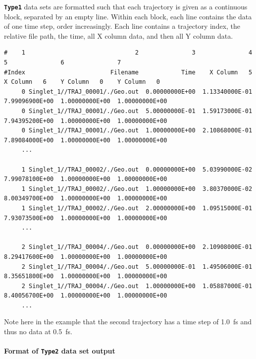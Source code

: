 \documentclass[a4paper,10pt,DIV=15,openany,twoside=false]{scrbook}
\newcommand{\ttt}[1]{\textbf{\texttt{#1}}}
\newenvironment{example}{
  \setlength{\OuterFrameSep}{3pt}
  \vspace{0mm}
  \definecolor{shadecolor}{HTML}{E4F4FF}
  \begin{shaded}
}{
  \end{shaded}
}
\begin{document}
\ttt{Type1} data sets are formatted such that each trajectory is given as a continuous block, separated by an empty line.
Within each block, each line contains the data of one time step, order increasingly.
Each line contains a trajectory index, the relative file path, the time, all X column data, and then all Y column data.
\begin{example}
\footnotesize\begin{verbatim}
#    1                               2               3               4               5               6               7
#Index                        Filename            Time    X Column   5    X Column   6    Y Column   0    Y Column   0
     0 Singlet_1//TRAJ_00001/./Geo.out  0.00000000E+00  1.13340000E-01  7.99096900E+00  1.00000000E+00  1.00000000E+00
     0 Singlet_1//TRAJ_00001/./Geo.out  5.00000000E-01  1.59173000E-01  7.94395200E+00  1.00000000E+00  1.00000000E+00
     0 Singlet_1//TRAJ_00001/./Geo.out  1.00000000E+00  2.10868000E-01  7.89084000E+00  1.00000000E+00  1.00000000E+00
     ...

     1 Singlet_1//TRAJ_00002/./Geo.out  0.00000000E+00  5.03990000E-02  7.99078100E+00  1.00000000E+00  1.00000000E+00
     1 Singlet_1//TRAJ_00002/./Geo.out  1.00000000E+00  3.80370000E-02  8.00349700E+00  1.00000000E+00  1.00000000E+00  
     1 Singlet_1//TRAJ_00002/./Geo.out  2.00000000E+00  1.09515000E-01  7.93073500E+00  1.00000000E+00  1.00000000E+00 
     ...

     2 Singlet_1//TRAJ_00004/./Geo.out  0.00000000E+00  2.10908000E-01  8.29417600E+00  1.00000000E+00  1.00000000E+00
     2 Singlet_1//TRAJ_00004/./Geo.out  5.00000000E-01  1.49506000E-01  8.35651800E+00  1.00000000E+00  1.00000000E+00
     2 Singlet_1//TRAJ_00004/./Geo.out  1.00000000E+00  1.05887000E-01  8.40056700E+00  1.00000000E+00  1.00000000E+00
     ...
\end{verbatim}
\end{example}
Note here in the example that the second trajectory has a time step of 1.0~fs and thus no data at 0.5~fs.

\paragraph{Format of \ttt{Type2} data set output}
\end{document}
